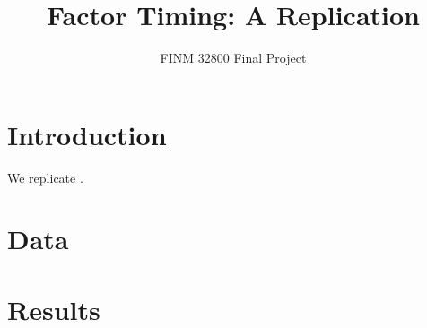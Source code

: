 \documentclass[12pt]{article}
\begin{document}
\title{Factor Timing: A Replication}
\author{FINM 32800 Final Project}
\maketitle

\section{Introduction}
We replicate \citet{haddad2020factor}.

\section{Data}

\section{Results}



\end{document}
